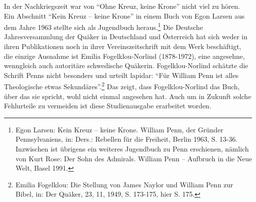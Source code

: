 \medskip

In der Nachkriegszeit war von "`Ohne Kreuz, keine Krone"' nicht viel zu hören.
Ein Abschnitt "`Kein Kreuz -- keine Krone"' in einem Buch von Egon Larsen aus
dem Jahre 1963 stellte sich als Jugendbuch heraus.\footnote{Egon Larsen: Kein
Kreuz -- keine Krone. William Penn, der Gründer
Pennsylvaniens, in: Ders.: Rebellen für die Freiheit, Berlin 1963, S. 13-36.
Inzwischen ist übrigens ein weiteres Jugendbuch zu Penn erschienen, nämlich von
Kurt Rose: Der Sohn des Admirals. William Penn -- Aufbruch in die Neue Welt,
Basel 1991.} Die Deutsche
Jahresversammlung der Quäker in Deutschland und Österreich hat sich weder in
ihren Publikationen noch in ihrer Vereinszeitschrift mit dem Werk beschäftigt,
die einzige Ausnahme ist Emilia Fogelklou-Norlind (1878-1972), eine angesehne,
wenngleich auch autoritäre schwedische Quäkerin. Fogelklou-Norlind schätzte die
Schrift Penns nicht besonders und urteilt lapidar: "`Für William Penn ist alles
Theologische etwas Sekundäres"'.\footnote{Emilia Fogelklou: Die Stellung von
James Naylor und William Penn zur Bibel,
in: Der Quäker, 23, 11, 1949, S. 173-175, hier S. 175.}  Das zeigt, dass
Fogelklou-Norlind das Buch, über das sie spricht, wohl nicht einmal angesehen
hat. Auch um in Zukunft solche Fehlurteile zu vermeiden ist diese Studienausgabe
erarbeitet worden.

